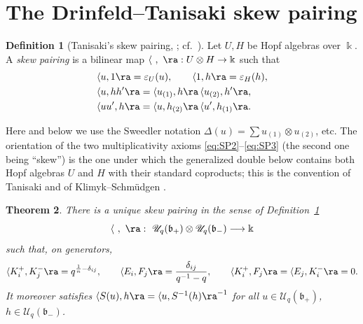 \documentclass[11pt]{amsart}
\newcommand{\bk}{\Bbbk}
\newcommand{\U}{\mathscr U}
\newcommand{\fb}{\mathfrak b}
\newcommand{\la}{\langle}
\newcommand{\KP}{K^{+}}
\newcommand{\KM}{K^{-}}
\theoremstyle{plain}
\newtheorem{theorem}{Theorem}[section]
\theoremstyle{definition}
\newtheorem{definition}[theorem]{Definition}
\numberwithin{equation}{section}
\begin{document}
\section{The Drinfeld--Tanisaki skew pairing}\label{sec:pairing}

\begin{definition}[Tanisaki's skew pairing, {\cite[Sec.~1]{Tan}};
cf.\ ]\label{def:skew}
Let $U,H$ be Hopf algebras over $\bk$.  A \emph{skew pairing} is a bilinear
map $\la\ ,\ \ra:U\otimes H\to\bk$ such that
\begin{align}
&\la u,1\ra=\varepsilon_U(u),\qquad \la 1,h\ra=\varepsilon_H(h),
\label{eq:SP1}\\
&\la u,hh'\ra=\la u_{(1)},h\ra\,\la u_{(2)},h'\ra,\label{eq:SP2}\\
&\la uu',h\ra=\la u,h_{(2)}\ra\,\la u',h_{(1)}\ra.\label{eq:SP3}
\end{align}
\end{definition}

Here and below we use the Sweedler notation
$\Delta(u)=\sum u_{(1)}\otimes u_{(2)}$, etc.  The orientation of the two
multiplicativity axioms \eqref{eq:SP2}--\eqref{eq:SP3} (the second one being
``skew'') is the one under which the generalized double below contains both
Hopf algebras $U$ and $H$ with their standard coproducts; this is the
convention of Tanisaki \cite{Tan} and of Klimyk--Schm\"udgen \cite[\S8]{KS}.

\begin{theorem}\label{thm:pairing-exists}
There is a unique skew pairing in the sense of
Definition~\ref{def:skew}
\[
\la\ ,\ \ra:\ \U_q(\fb_+)\otimes \U_q(\fb_-)\longrightarrow \bk
\]
such that, on generators,
\begin{equation}\label{eq:pairing-values}
\la \KP_i,\KM_j\ra=q^{\frac1n-\delta_{ij}},\qquad
\la E_i,F_j\ra=\frac{\delta_{ij}}{q^{-1}-q},\qquad
\la \KP_i,F_j\ra=\la E_j,\KM_i\ra=0 .
\end{equation}
It moreover satisfies $\la S(u),h\ra=\la u,S^{-1}(h)\ra^{-1}$
for all $u\in\U_q(\fb_+)$, $h\in\U_q(\fb_-)$.
\end{theorem}
\end{document}
